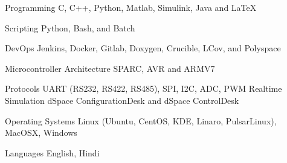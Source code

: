 

\begin{cvskills}

  \cvskill
    {Programming} %
    {C, C++, Python, Matlab, Simulink, Java and LaTeX} %

%
  \cvskill
    {Scripting} %
    {Python, Bash, and Batch} %

%
  \cvskill
    {DevOps} %
    {Jenkins, Docker, Gitlab, Doxygen, Crucible, LCov, and Polyspace} %

  \cvskill
    {Microcontroller Architecture} %
    {SPARC, AVR and ARMV7} %

  \cvskill
    {Protocols} %
	{UART (RS232, RS422, RS485), SPI, I2C, ADC, PWM} %
  \cvskill
    {Realtime Simulation} %
    {dSpace ConfigurationDesk and dSpace ControlDesk} %

  \cvskill
    {Operating Systems} %
    {Linux (Ubuntu, CentOS, KDE, Linaro, PulsarLinux), MacOSX, Windows} %

  \cvskill
    {Languages} %
    {English, Hindi} %

\end{cvskills}

